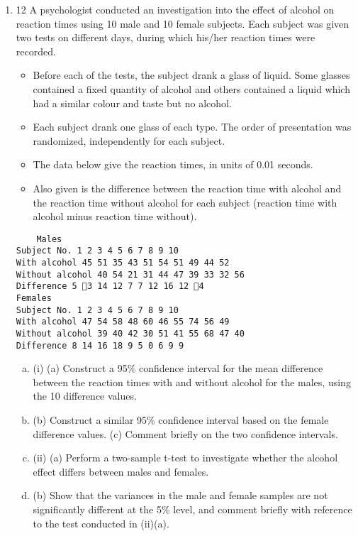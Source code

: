 \documentclass[a4paper,12pt]{article}
\begin{document}
\begin{enumerate}
\item 12 A psychologist conducted an investigation into the effect of alcohol on reaction times
using 10 male and 10 female subjects. Each subject was given two tests on different
days, during which his/her reaction times were recorded.
\begin{itemize}
    \item Before each of the tests, the subject drank a glass of liquid. Some glasses contained a
fixed quantity of alcohol and others contained a liquid which had a similar colour and
taste but no alcohol.
\item Each subject drank one glass of each type. The order of
presentation was randomized, independently for each subject.
\item The data below give the reaction times, in units of 0.01 seconds.
\item Also given is the
difference between the reaction time with alcohol and the reaction time without
alcohol for each subject (reaction time with alcohol minus reaction time without).
\end{itemize}

\begin{verbatim}
    Males
Subject No. 1 2 3 4 5 6 7 8 9 10
With alcohol 45 51 35 43 51 54 51 49 44 52
Without alcohol 40 54 21 31 44 47 39 33 32 56
Difference 5 3 14 12 7 7 12 16 12 4
Females
Subject No. 1 2 3 4 5 6 7 8 9 10
With alcohol 47 54 58 48 60 46 55 74 56 49
Without alcohol 39 40 42 30 51 41 55 68 47 40
Difference 8 14 16 18 9 5 0 6 9 9
\end{verbatim}

\begin{enumerate}[(a)]
    \item (i) (a) Construct a 95\% confidence interval for the mean difference between
the reaction times with and without alcohol for the males, using the 10
difference values.
    \item  (b) Construct a similar 95\% confidence interval based on the female
difference values.
(c) Comment briefly on the two confidence intervals. 
    \item  (ii) (a) Perform a two-sample t-test to investigate whether the alcohol effect
differs between males and females.
    \item (b) Show that the variances in the male and female samples are not
significantly different at the 5\% level, and comment briefly with
reference to the test conducted in (ii)(a). 
\end{enumerate}


\end{enumerate}
\end{document}
